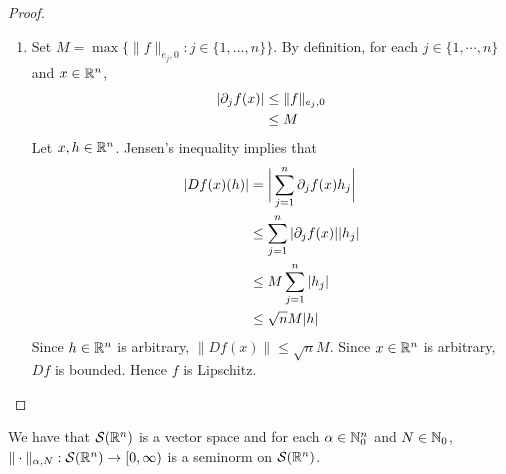 \documentclass{book}
\begin{document}
	\begin{proof}\
		\begin{enumerate}
			\item Set $M = \max \{\|f\|_{e_j, 0} : j \in \{1, \ldots, n\}\}$. By definition, for each $j \in \{1, \cdots, n\}$ and $x \in \mathbb{R}^n$, 
			\begin{align*}
				| \partial_j f(x)| 
				& \leq \|f\|_{e_j, 0} \\
				& \leq M  
			\end{align*}
			Let $x, h \in \mathbb{R}^n$. Jensen's inequality implies that
			\begin{align*}
				|Df(x)(h)|
				& = \bigg| \sum_{j = 1}^n \partial_jf(x) h_j \bigg| \\
				& \leq \sum_{j = 1}^n |\partial_jf(x)| |h_j| \\
				& \leq M \sum_{j = 1}^n |h_j| \\
				& \leq \sqrt{n} M |h| 
			\end{align*}
			Since $h \in \mathbb{R}^n$ is arbitrary, $\|Df(x)\| \leq \sqrt{n}M$. Since $x \in \mathbb{R}^n$ is arbitrary, $Df$ is bounded. Hence $f$ is Lipschitz.
			
		\end{enumerate}
	\end{proof}

	\begin{ex} We have that $\mathcal{S}(\mathbb{R}^n)$ is a vector space and for each $\alpha \in \mathbb{N}_0^n$ and $N \in  \mathbb{N}_0$,  $\| \cdot \|_{\alpha, N}: \mathcal{S}(\mathbb{R}^n) \rightarrow [0,\infty)$ is a seminorm on $\mathcal{S}(\mathbb{R}^n)$.
	\end{ex}
\end{document}

